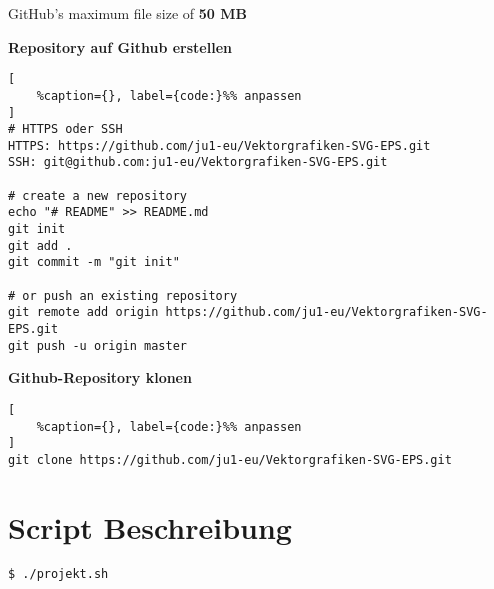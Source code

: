 GitHub's maximum file size of \textbf{50 MB}

\textbf{Repository auf Github erstellen}

\lstset{language=C}%
\begin{lstlisting}[
	%caption={}, label={code:}%% anpassen
]
# HTTPS oder SSH
HTTPS: https://github.com/ju1-eu/Vektorgrafiken-SVG-EPS.git
SSH: git@github.com:ju1-eu/Vektorgrafiken-SVG-EPS.git

# create a new repository 
echo "# README" >> README.md
git init
git add .
git commit -m "git init"
                
# or push an existing repository 
git remote add origin https://github.com/ju1-eu/Vektorgrafiken-SVG-EPS.git
git push -u origin master
\end{lstlisting}

\textbf{Github-Repository klonen}

\lstset{language=C}%
\begin{lstlisting}[
	%caption={}, label={code:}%% anpassen
]
git clone https://github.com/ju1-eu/Vektorgrafiken-SVG-EPS.git
\end{lstlisting}

\section{Script Beschreibung}\label{script-beschreibung}

\verb|$ ./projekt.sh|

